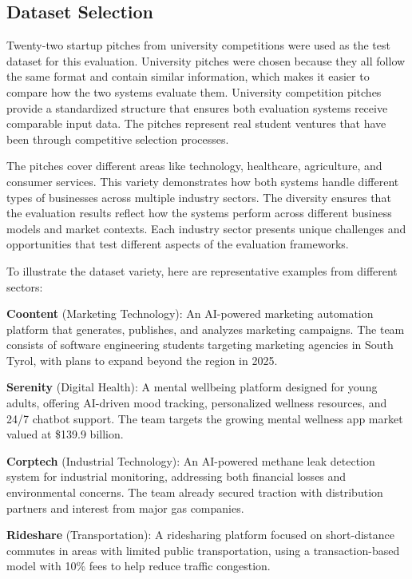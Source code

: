\subsection{Dataset Selection}
\label{subsec:dataset}

Twenty-two startup pitches from university competitions were used as the test dataset for this evaluation. University pitches were chosen because they all follow the same format and contain similar information, which makes it easier to compare how the two systems evaluate them. University competition pitches provide a standardized structure that ensures both evaluation systems receive comparable input data. The pitches represent real student ventures that have been through competitive selection processes.

The pitches cover different areas like technology, healthcare, agriculture, and consumer services. This variety demonstrates how both systems handle different types of businesses across multiple industry sectors. The diversity ensures that the evaluation results reflect how the systems perform across different business models and market contexts. Each industry sector presents unique challenges and opportunities that test different aspects of the evaluation frameworks.

To illustrate the dataset variety, here are representative examples from different sectors:

\textbf{Coontent} (Marketing Technology): An AI-powered marketing automation platform that generates, publishes, and analyzes marketing campaigns. The team consists of software engineering students targeting marketing agencies in South Tyrol, with plans to expand beyond the region in 2025.

\textbf{Serenity} (Digital Health): A mental wellbeing platform designed for young adults, offering AI-driven mood tracking, personalized wellness resources, and 24/7 chatbot support. The team targets the growing mental wellness app market valued at \$139.9 billion.

\textbf{Corptech} (Industrial Technology): An AI-powered methane leak detection system for industrial monitoring, addressing both financial losses and environmental concerns. The team already secured traction with distribution partners and interest from major gas companies.

\textbf{Rideshare} (Transportation): A ridesharing platform focused on short-distance commutes in areas with limited public transportation, using a transaction-based model with 10\% fees to help reduce traffic congestion.

